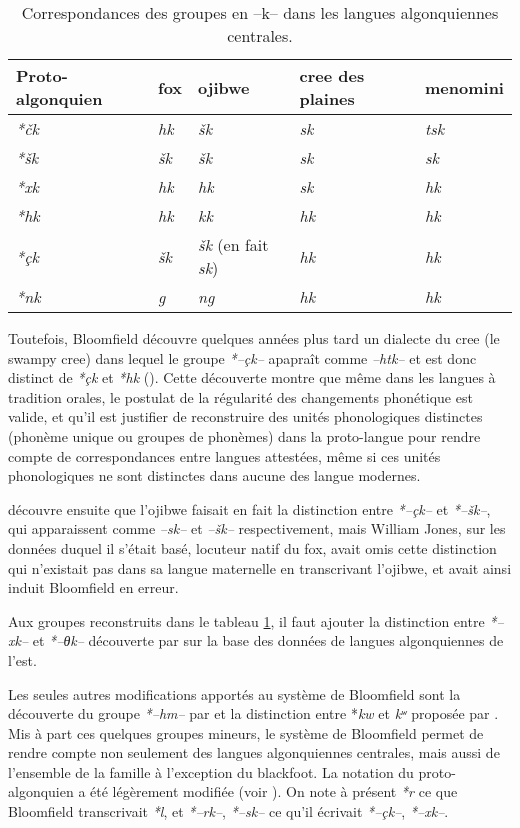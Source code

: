 \documentclass[twoside,a4paper,11pt]{article}
\newcommand{\ipa}[1]{{\phon\textit{#1}}}
\newcommand{\Σ}{\greek{Σ}}
\begin{document}
\begin{table}[H]
\caption{Correspondances des groupes en --k-- dans les langues algonquiennes centrales.} \centering  \label{tab:clusters.k}
\begin{tabular}{lllll}
\toprule
Proto-algonquien & fox & ojibwe & cree des plaines & menomini \\
\midrule
\ipa{*čk} & \ipa{hk} & \ipa{šk} & \ipa{sk} & \ipa{tsk} \\
\ipa{*šk} & \ipa{šk} & \ipa{šk} & \ipa{sk} & \ipa{sk} \\
\ipa{*xk} & \ipa{hk} & \ipa{hk} & \ipa{sk} & \ipa{hk} \\
\ipa{*hk} & \ipa{hk} & \ipa{kk} & \ipa{hk} & \ipa{hk} \\
\ipa{*çk} & \ipa{šk} & \ipa{šk} (en fait \ipa{sk}) & \ipa{hk} & \ipa{hk} \\
\ipa{*nk} & \ipa{g} & \ipa{ng} & \ipa{hk} & \ipa{hk} \\
\bottomrule
\end{tabular}
\end{table}

Toutefois, Bloomfield découvre quelques années plus tard un dialecte du cree (le swampy cree) dans lequel le groupe \ipa{*--çk--} apapraît comme \ipa{--htk--} et est donc distinct de \ipa{*çk}  et \ipa{*hk} (\citealt{bloomfield28thk}). Cette découverte montre que même dans les langues à tradition orales, le postulat de la régularité des changements phonétique est valide, et qu'il est justifier de reconstruire des unités phonologiques distinctes (phonème unique ou groupes de phonèmes) dans la proto-langue pour rendre compte de correspondances entre langues attestées, même si ces unités phonologiques ne sont distinctes dans aucune des langue modernes. 

\citet{bloomfield46proto} découvre ensuite que l'ojibwe faisait en fait la distinction entre  \ipa{*--çk--} et \ipa{*--šk--}, qui apparaissent comme \ipa{--sk--} et \ipa{--šk--} respectivement, mais William Jones, sur les données duquel il s'était basé, locuteur natif du fox, avait omis cette distinction qui n'existait pas dans sa langue maternelle en transcrivant l'ojibwe, et avait ainsi induit Bloomfield en erreur.

Aux groupes reconstruits dans le tableau \ref{tab:clusters.k}, il faut ajouter la distinction entre \ipa{*--xk--} et \ipa{*--θk--} découverte par \citet{siebert41clusters} sur la base des données de langues algonquiennes de l'est. 

Les seules autres modifications apportés au système de Bloomfield sont la découverte du groupe  \ipa{*--hm--} par \citet{goddard79comparative} et la distinction entre *\ipa{kw} et \ipa{kʷ} proposée par \citet{pentland79phd}. Mis à part ces quelques groupes mineurs, le système   de Bloomfield permet de rendre compte non seulement des langues algonquiennes centrales, mais aussi de l'ensemble de la famille à l'exception du blackfoot. La notation du proto-algonquien a été légèrement modifiée (voir \citealt{goddard98arapaho}). On note à présent \ipa{*r} ce que Bloomfield transcrivait \ipa{*l}, et \ipa{*--rk--},  \ipa{*--sk--} ce qu'il écrivait \ipa{*--çk--},  \ipa{*--xk--}.
\end{document}
